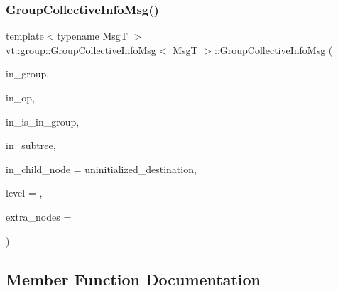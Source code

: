 \mbox{\label{structvt_1_1group_1_1_group_collective_info_msg_acac57af50d715f4fadcceda26dee5d4f}} 
\subsubsection{\texorpdfstring{Group\+Collective\+Info\+Msg()}{GroupCollectiveInfoMsg()}\hspace{0.1cm}{\footnotesize\ttfamily [2/2]}}
{\footnotesize\ttfamily template$<$typename MsgT $>$ \\
\hyperlink{structvt_1_1group_1_1_group_collective_info_msg}{vt\+::group\+::\+Group\+Collective\+Info\+Msg}$<$ MsgT $>$\+::\hyperlink{structvt_1_1group_1_1_group_collective_info_msg}{Group\+Collective\+Info\+Msg} (\begin{DoxyParamCaption}\item[{\hyperlink{namespacevt_a27b5e4411c9b6140c49100e050e2f743}{Group\+Type} const \&}]{in\+\_\+group,  }\item[{\hyperlink{namespacevt_1_1group_a73f2624ddeb535b39a08b6524f26b244}{Remote\+Operation\+I\+D\+Type}}]{in\+\_\+op,  }\item[{bool}]{in\+\_\+is\+\_\+in\+\_\+group,  }\item[{\hyperlink{namespacevt_a866da9d0efc19c0a1ce79e9e492f47e2}{Node\+Type} const \&}]{in\+\_\+subtree,  }\item[{\hyperlink{namespacevt_a866da9d0efc19c0a1ce79e9e492f47e2}{Node\+Type} const \&}]{in\+\_\+child\+\_\+node = {\ttfamily uninitialized\+\_\+destination},  }\item[{\hyperlink{structvt_1_1group_1_1_group_collective_info_msg_a3d20316314d3cc3ac13ff4c5250203a5}{Count\+Type} const \&}]{level = {},  }\item[{\hyperlink{structvt_1_1group_1_1_group_collective_info_msg_a3d20316314d3cc3ac13ff4c5250203a5}{Count\+Type} const \&}]{extra\+\_\+nodes = {} }\end{DoxyParamCaption})\hspace{0.3cm}{\ttfamily [inline]}}



\subsection{Member Function Documentation}
\mbox{\label{structvt_1_1group_1_1_group_collective_info_msg_a5e4adf90fa896fbb82b80b72edefc7d4}} 
